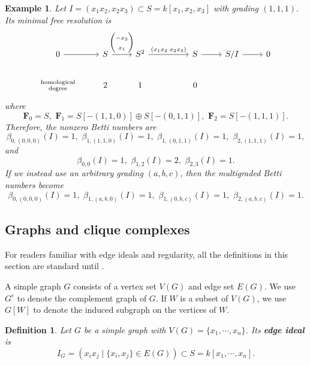 \documentclass[dvipsnames,10pt]{article}
\newtheorem{defi}[theorem]{Definition}
\newtheorem{example}[theorem]{Example}
\newcommand{\gb}[1]{{\color{red} \textup{(\!(GB: #1)\!)}}}
\begin{document}
\begin{example}
    Let $I=(x_1x_2,x_2x_3)\subset S=k[x_1,x_2,x_3]$ with grading $(1,1,1)$. Its minimal free resolution is
    \begin{equation*}
        \begin{tikzcd}[ampersand replacement=\&]
            0 \arrow[r] \& S \arrow[r, "{
                \begin{pmatrix}
                    -x_3 \\
                    x_1
                \end{pmatrix}
            }"] \& S^2 \arrow[rr, "{
                (x_1x_2 \; x_2x_3)
            }"] \&\& S \arrow[r] \& S/I \arrow[r] \& 0\\
            \substack{\text{homological} \\ \text{degree}}\& 2 \& 1 \&\& 0 \& \&
        \end{tikzcd}
    \end{equation*}
    where
    \[
        \mathbf{F}_0 = S,\,\, \mathbf{F}_1 = S[-(1,1,0)]\oplus S[-(0,1,1)],\,\, \mathbf{F}_2 = S[-(1,1,1)].
    \]
    Therefore, the nonzero Betti numbers are
    \[
        \beta_{0,(0,0,0)}(I) = 1,\,\, \beta_{1,(1,1,0)}(I) = 1,\,\,\beta_{1,(0,1,1)}(I) = 1,\,\,\beta_{2,(1,1,1)}(I) = 1,
    \]
    and
    \[
        \beta_{0,0}(I) = 1,\,\, \beta_{1,2}(I) = 2,\,\, \beta_{2,3}(I) = 1.
    \]
    If we instead use an arbitrary grading $(a,b,c)$, then the multigraded Betti numbers become
    \[
        \beta_{0,(0,0,0)}(I) = 1,\,\, \beta_{1,(a,b,0)}(I) = 1,\,\, \beta_{1,(0,b,c)}(I) = 1,\,\, \beta_{2,(a,b,c)}(I) = 1.
    \]
\end{example}
\subsection{Graphs and clique complexes}
For readers familiar with edge ideals and regularity, all the definitions in this section are standard until .

A simple graph $G$ consists of a vertex set $V(G)$ and edge set $E(G)$. We use $G^c$ to denote the complement graph of $G$. If $W$ is a subset of $V(G)$, we use $G[W]$ to denote the induced subgraph on the vertices of $W$.

\begin{defi}
    Let $G$ be a simple graph with $V(G)=\{x_1,\cdots,x_n\}$. Its \textbf{edge ideal} is
    \begin{equation*}
        I_G=\left(x_ix_j\mid \{x_i,x_j\}\in E(G)\right) \subset S=k[x_1,\cdots,x_n].
    \end{equation*}
\end{defi}
\end{document}
